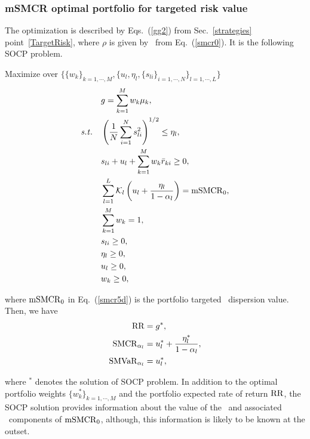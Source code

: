

\BackToContents

\subsubsection{mSMCR optimal portfolio for targeted risk value}
The optimization is described by Eqs.~(\ref{gg2}) from Sec.~\ref{strategies} point~\ref{TargetRisk}, where
$\rho$ is given by \mSMCR\ from Eq.~(\ref{smcr0}).
It is the following SOCP problem.

\bigskip
\noindent Maximize over $\{ \{w_k\}_{k=1,\cdots,M}, \{ u_l, \eta_l, \{ s_{li}\}_{i=1,\cdots,N} \}_{l=1,\cdots, L}\}$
\begin{subequations}\label{smcr5}
\begin{align}
    &g = \sum_{k=1}^M w_k \mu_k, \label{smcr5a} \\
    \st &\left( \frac{1}{N} \sum_{i=1}^N s_{li}^2 \right)^{1/2} \leq \eta_l, \label{smcr5b} \\
        &s_{li} + u_l + \sum_{k=1}^M w_k \br_{ki} \geq 0, \label{smcr5c} \\
        &\sum_{l=1}^L \cK_l\left( u_l + \frac{\eta_l}{1 - \alpha_l} \right) = \mSMCR_0, \label{smcr5d} \\
        &\sum_{k=1}^M w_k = 1, \label{smcr5e} \\
        &s_{li} \geq 0, \label{smcr5f} \\
        &\eta_l \geq 0, \label{smcr5h} \\
        &u_l \geq 0, \label{smcr5i} \\
        &w_k \geq 0, \label{smcr5g}
\end{align}
\end{subequations}

\noindent where ${\rm mSMCR}_0$ in Eq.~(\ref{smcr5d}) is the portfolio targeted \mSMCR\ dispersion value.
Then, we have
\begin{subequations}\label{smcr6}
\begin{align}
    \RR &= g^*, \label{smcr6a} \\
    \SMCR_{\alpha_l} &= u_l^* + \frac{\eta_l^*}{1-\alpha_l} , \label{smcr6b} \\
    \SMVaR_{\alpha_l} &= u_l^*, \label{smcr6c}
\end{align}
\end{subequations}

\noindent where $^*$ denotes the solution of SOCP problem.
In addition to the optimal portfolio weights $\{w_k^*\}_{k=1,\cdots,M}$ and the portfolio expected rate of return ${\rm RR}$,
the SOCP solution provides information about the value of the \SMCR\ and associated \SMVaR\
components of ${\rm mSMCR}_0$, although, this information is likely to be known at the outset.

